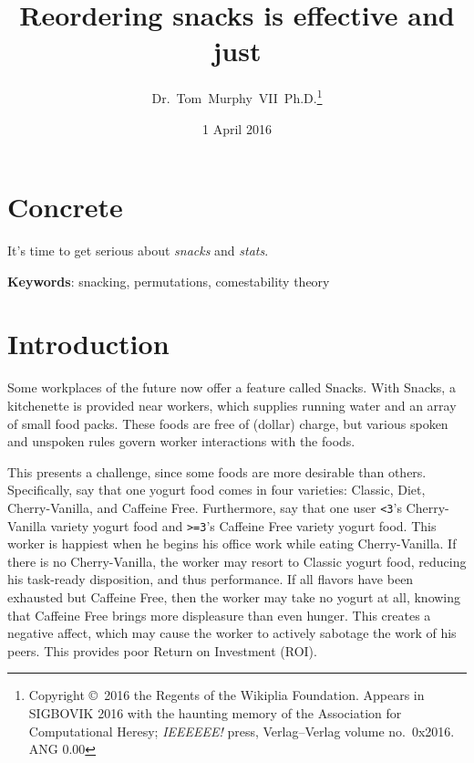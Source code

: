 \documentclass[twocolumn]{article}
\begin{document}
 

\title{Reordering snacks is effective and just}
\author{Dr.~Tom~Murphy~VII~Ph.D.\thanks{
    Copyright \copyright\ 2016 the Regents of the Wikiplia Foundation.
    Appears in SIGBOVIK 2016 with the haunting memory of the
    Association for Computational Heresy; {\em IEEEEEE!} press,
    Verlag--Verlag volume no.~0x2016. ANG 0.00} }

\renewcommand\>{$>$}
\newcommand\<{$<$}

\date{1 April 2016}

\maketitle

\section*{Concrete}
It's time to get serious about {\em snacks} and {\em stats}.

\vspace{1em}
{\noindent \small {\bf Keywords}:
  snacking, permutations, comestability theory
}

\section{Introduction}

Some workplaces of the future now offer a feature called Snacks. With Snacks, a kitchenette is provided near workers, which supplies running water and an array of small food packs. These foods are free of (dollar) charge, but various spoken and unspoken rules govern worker interactions with the foods.

This presents a challenge, since some foods are more desirable than others. Specifically, say that one yogurt food comes in four varieties: Classic, Diet, Cherry-Vanilla, and Caffeine Free. Furthermore, say that one user \verb+<3+'s Cherry-Vanilla variety yogurt food and \verb+>=3+'s Caffeine Free variety yogurt food. This worker is happiest when he begins his office work while eating Cherry-Vanilla. If there is no Cherry-Vanilla, the worker may resort to Classic yogurt food, reducing his task-ready disposition, and thus performance. If all flavors have been exhausted but Caffeine Free, then the worker may take no yogurt at all, knowing that Caffeine Free brings more displeasure than even hunger. This creates a negative affect, which may cause the worker to actively sabotage the work of his peers. This provides poor Return on Investment (ROI).
\end{document}
